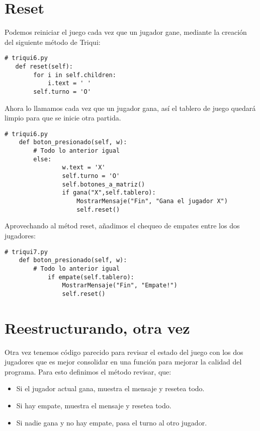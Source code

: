 \section{Reset}

Podemos reiniciar el juego cada vez que un jugador gane, mediante la 
creación del siguiente método de Triqui:

\beforeverb
\begin{verbatim}
# triqui6.py
   def reset(self):
        for i in self.children:
            i.text = ' '
        self.turno = 'O'
\end{verbatim}
\afterverb

Ahora lo llamamos cada vez que un jugador gana, así el tablero de
juego quedará limpio para que se inicie otra partida.

\beforeverb
\begin{verbatim}
# triqui6.py
    def boton_presionado(self, w):
        # Todo lo anterior igual
        else:
                w.text = 'X'
                self.turno = 'O'
                self.botones_a_matriz()
                if gana("X",self.tablero):
                    MostrarMensaje("Fin", "Gana el jugador X")
                    self.reset()
\end{verbatim}
\afterverb

Aprovechando al métod reset, añadimos el chequeo de empates entre 
los dos jugadores:

\beforeverb
\begin{verbatim}
# triqui7.py
    def boton_presionado(self, w):
        # Todo lo anterior igual
            if empate(self.tablero):
                MostrarMensaje("Fin", "Empate!")
                self.reset()
\end{verbatim}
\afterverb

\section{Reestructurando, otra vez}

Otra vez tenemos código parecido para revisar el estado del juego
con los dos jugadores que es mejor consolidar en una función para 
mejorar la calidad del programa. Para esto definimos el método 
revisar, que:

\begin{itemize}
 \item Si el jugador actual gana, muestra el mensaje y resetea todo.
 
 \item Si hay empate, muestra el mensaje y resetea todo.
 
 \item Si nadie gana y no hay empate, pasa el turno al otro jugador.
\end{itemize}

